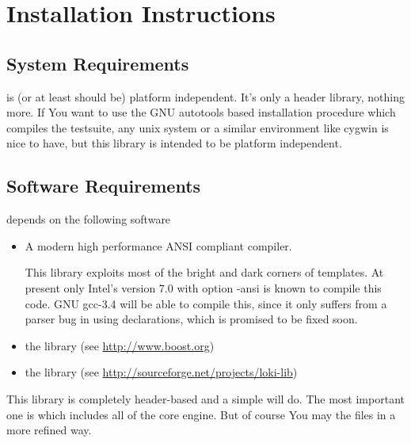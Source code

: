 

\section{Installation Instructions}
\label{sec: Installation Instructions}


\subsection{System Requirements}
\label{sec: System Requirements}

\Daixtrose is (or at least should be) platform independent. It's only a \CC
header library, nothing more.
If You want to use the GNU autotools based installation procedure which
compiles the testsuite, any unix system or a similar environment like cygwin is
nice to have, but this library is intended to be platform independent.

\subsection{Software Requirements}
\label{sec: Software Requirements}

\Daixtrose depends on the following software
%

\begin{itemize}
\setlength{\itemsep}{5pt minus 5pt}
\setlength{\parsep}{0pt}
\setlength{\parskip}{0pt}


\item A modern high performance ANSI compliant \CC compiler.  
  
  This library exploits most of the bright and dark corners of \CC templates. At
  present only Intel's \CC version 7.0 with option -ansi is known to compile
  this code. GNU gcc-3.4 will be able to compile this, since it only
  suffers from a parser bug in using declarations, which is promised to be fixed
  soon.

\item the  
library (see \url{http://www.boost.org})
\item the  library (see \url{http://sourceforge.net/projects/loki-lib})
\end{itemize}



This library is completely header-based and a simple 
 will do. The most important one is
 which includes all of the core engine. But of
course You may  the files in a more refined way.

